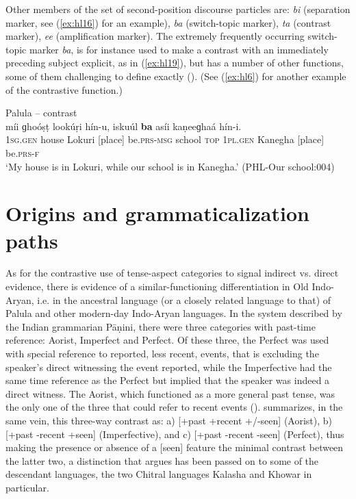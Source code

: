 \documentclass[output=paper]{langsci/langscibook}
\begin{document}
Other members of the set of second-position discourse particles are: \textit{bi} (separation marker, see ‎(\ref{ex:hl16}) for an example), \textit{ba} (switch-topic marker), \textit{ta} (contrast marker), \textit{ee} (amplification marker). The extremely frequently occurring switch-topic marker \textit{ba}, is for instance used to make a contrast with an immediately preceding subject explicit, as in ‎(\ref{ex:hl19}), but has a number of other functions, some of them challenging to define exactly (\citealt[419--425]{Liljegren2016}). (See ‎(\ref{ex:hl6}) for another example of the contrastive function.) 

\begin{exe}
	\ex Palula -- contrast \label{ex:hl19}\\
	\gll míi ɡhoóṣṭ lookúṛi hín-u, iskuúl \textbf{ba} asíi kaṇeeɡhaá hín-i.\\
	1\textsc{sg}.\textsc{gen} house Lokuri [place] be.\textsc{prs}-\textsc{msg} school \textsc{top} 1\textsc{pl}.\textsc{gen} Kanegha [place] be.\textsc{prs}-\textsc{f}\\
	\trans ‘My house is in Lokuri, while our school is in Kanegha.’ (PHL-Our school:004)
\end{exe}


\section{Origins and grammaticalization paths}\label{s:hl6}

As for the contrastive use of tense-aspect categories to signal indirect vs. direct evidence, there is evidence of a similar-functioning differentiation in Old Indo-Aryan, i.e. in the ancestral language (or a closely related language to that) of Palula and other modern-day Indo-Aryan languages. In the system described by the Indian grammarian Pāṇini, there were three categories with past-time reference: Aorist, Imperfect and Perfect. Of these three, the Perfect was used with special reference to reported, less recent, events, that is excluding the speaker’s direct witnessing the event reported, while the Imperfective had the same time reference as the Perfect but implied that the speaker was indeed a direct witness. The Aorist, which functioned as a more general past tense, was the only one of the three that could refer to recent events (\citealt[235]{Cardona2002}). \cite[62]{Deshpande1981} summarizes, in the same vein, this three-way contrast as: a) [+past +recent +/-seen] (Aorist), b) [+past -recent +seen] (Imperfective), and c) [+past -recent -seen] (Perfect), thus making the presence or absence of a [seen] feature the minimal contrast between the latter two, a distinction that \cite{Bashir2006} argues has been passed on to some of the descendant languages, the two Chitral languages Kalasha and Khowar in particular.  
\end{document}
